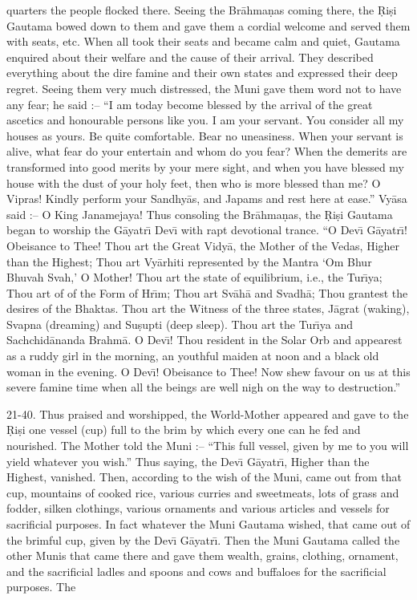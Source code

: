 quarters the people flocked there. Seeing the Br\=ahma\d{n}as coming there, the \d{R}i\d{s}i Gautama bowed down to them and gave them a cordial welcome and served them with seats, etc. When all took their seats and became calm and quiet, Gautama enquired about their welfare and the cause of their arrival. They described everything about the dire famine and their own states and expressed their deep regret. Seeing them very much distressed, the Muni gave them word not to have any fear; he said :-- ``I am today become blessed by the arrival of the great ascetics and honourable persons like you. I am your servant. You consider all my houses as yours. Be quite comfortable. Bear no uneasiness. When your servant is alive, what fear do your entertain and whom do you fear? When the demerits are transformed into good merits by your mere sight, and when you have blessed my house with the dust of your holy feet, then who is more blessed than me? O Vipras! Kindly perform your Sandhy\=as, and Japams and rest here at ease.'' Vy\=asa said :-- O King Janamejaya! Thus consoling the Br\=ahma\d{n}as, the \d{R}i\d{s}i Gautama began to worship the G\=ayatr\={\i} Dev\={\i} with rapt devotional trance. ``O Dev\={\i} G\=ayatr\={\i}! Obeisance to Thee! Thou art the Great Vidy\=a, the Mother of the Vedas, Higher than the Highest; Thou art Vy\=arhiti represented by the Mantra `Om Bhur Bhuvah Svah,' O Mother! Thou art the state of equilibrium, i.e., the Tur\={\i}ya; Thou art of of the Form of Hr\={\i}m; Thou art Sv\=ah\=a and Svadh\=a; Thou grantest the desires of the Bhaktas. Thou art the Witness of the three states, J\=agrat (waking), Svapna (dreaming) and Su\d{s}upti (deep sleep). Thou art the Tur\={\i}ya and Sachchid\=ananda Brahm\=a. O Dev\={\i}! Thou resident in the Solar Orb and appearest as a ruddy girl in the morning, an youthful maiden at noon and a black old woman in the evening. O Dev\={\i}! Obeisance to Thee! Now shew favour on us at this severe famine time when all the beings are well nigh on the way to destruction.''

21-40. Thus praised and worshipped, the World-Mother appeared and gave to the \d{R}i\d{s}i one vessel (cup) full to the brim by which every one can he fed and nourished. The Mother told the Muni :-- ``This full vessel, given by me to you will yield whatever you wish.'' Thus saying, the Dev\={\i} G\=ayatr\={\i}, Higher than the Highest, vanished. Then, according to the wish of the Muni, came out from that cup, mountains of cooked rice, various curries and sweetmeats, lots of grass and fodder, silken clothings, various ornaments and various articles and vessels for sacrificial purposes. In fact whatever the Muni Gautama wished, that came out of the brimful cup, given by the Dev\={\i} G\=ayatr\={\i}. Then the Muni Gautama called the other Munis that came there and gave them wealth, grains, clothing, ornament, and the sacrificial ladles and spoons and cows and buffaloes for the sacrificial purposes. The

